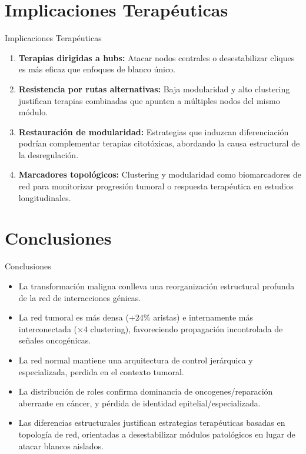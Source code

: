 \documentclass[12pt]{beamer}
\begin{document}
	\section{Implicaciones Terapéuticas}
	\begin{frame}{Implicaciones Terapéuticas}
		\begin{enumerate}
			\item \textbf{Terapias dirigidas a hubs:} Atacar nodos centrales o desestabilizar cliques es más eficaz que enfoques de blanco único.
			\item \textbf{Resistencia por rutas alternativas:} Baja modularidad y alto clustering justifican terapias combinadas que apunten a múltiples nodos del mismo módulo.
			\item \textbf{Restauración de modularidad:} Estrategias que induzcan diferenciación podrían complementar terapias citotóxicas, abordando la causa estructural de la desregulación.
			\item \textbf{Marcadores topológicos:} Clustering y modularidad como biomarcadores de red para monitorizar progresión tumoral o respuesta terapéutica en estudios longitudinales.
		\end{enumerate}
	\end{frame}
	
	\section{Conclusiones}
	\begin{frame}{Conclusiones}
		\begin{itemize}
			\item La transformación maligna conlleva una reorganización estructural profunda de la red de interacciones génicas.
			\item La red tumoral es más densa ($+24\%$ aristas) e internamente más interconectada ($\times 4$ clustering), favoreciendo propagación incontrolada de señales oncogénicas.
			\item La red normal mantiene una arquitectura de control jerárquica y especializada, perdida en el contexto tumoral.
			\item La distribución de roles confirma dominancia de oncogenes/reparación aberrante en cáncer, y pérdida de identidad epitelial/especializada.
			\item Las diferencias estructurales justifican estrategias terapéuticas basadas en topología de red, orientadas a desestabilizar módulos patológicos en lugar de atacar blancos aislados.
		\end{itemize}
	\end{frame}
	
\end{document}

